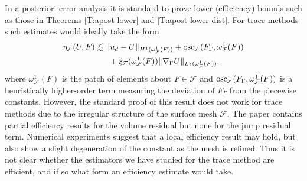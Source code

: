 \begin{remark}[efficiency]
 In a posteriori error analysis it is standard to prove lower (efficiency) bounds such as those in Theorems \ref{T:apost-lower} and \ref{T:apost-lower-dist}.  For trace methods such estimates would ideally take the form
%
\[ 
\begin{aligned}
   \eta_{\mathcal{F}}(U,F) &  \lesssim \|u_d-U\|_{H^1(\omega_{\mathcal{F}}^1(F))} +
   \operatorname{osc}_{\mathcal{F}} (F_\Gamma, \omega_{\mathcal{F}}^1(F))
   \\ & ~~~~~+ \xi_{\mathcal{F}} (\omega_{\mathcal{F}}^1(F)) \|\nabla_\Gamma U\|_{L_2(\omega_{\mathcal{F}}^1(F))}.
   \end{aligned}
\]   
%   
where $\omega_{\mathcal{F}}^1(F)$ is the patch of elements about $F \in \mathcal{F}$ and  $\operatorname{osc}_{\mathcal{F}} (F_\Gamma, \omega_{\mathcal{F}}^1(F))$ is a heuristically higher-order term measuring the deviation of $F_\Gamma$ from the piecewise constants.  However, the standard proof of this result does not work for trace methods due to the irregular structure of the surface mesh $\mathcal{F}$.  The paper \cite{DO12} contains partial efficiency results for the volume residual but none for the jump residual term.  Numerical experiments suggest that a local efficiency result may hold, but also show a slight degeneration of the constant as the mesh is refined.  Thus it is not clear whether the estimators we have studied for the trace method are efficient, and if so what form an efficiency estimate would take.  
\end{remark}

